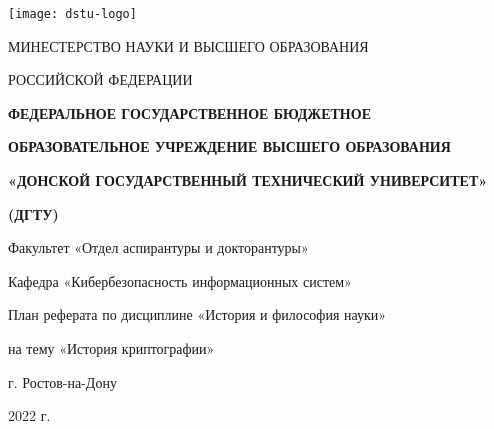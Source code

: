 \begin{titlepage}
	\centerline{\texttt{[image: dstu-logo]}}
	\vfill
	\centerline{МИНЕСТЕРСТВО НАУКИ И ВЫСШЕГО ОБРАЗОВАНИЯ}
	\centerline{РОССИЙСКОЙ ФЕДЕРАЦИИ}
	\vfill
	\centerline{\bf ФЕДЕРАЛЬНОЕ ГОСУДАРСТВЕННОЕ БЮДЖЕТНОЕ}
	\centerline{\bf ОБРАЗОВАТЕЛЬНОЕ УЧРЕЖДЕНИЕ ВЫСШЕГО ОБРАЗОВАНИЯ}
	\centerline{\bf «ДОНСКОЙ ГОСУДАРСТВЕННЫЙ ТЕХНИЧЕСКИЙ УНИВЕРСИТЕТ»}
	\centerline{\bf (ДГТУ)}
	\normalsize
	\vfill\vfill
	\centerline{Факультет «Отдел аспирантуры и докторантуры»}
	\centerline{Кафедра «Кибербезопасность информационных систем»}
	\vfill
	\vfill
	\centerline{План реферата по дисциплине «История и философия науки»}
	\centerline{на тему «История криптографии»}
	\vfill
	\vfill
	\vfill
	\vfill
	\vfill
	\vfill
	\vfill
	\vfill
	\vfill
	
	\centerline{г. Ростов-на-Дону}
	\centerline{2022 г.}
	
\end{titlepage}
\setcounter{page}{2}